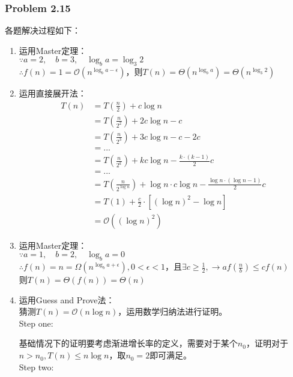 \documentclass[UTF8,12pt]{article} %
\makeatletter
\theoremstyle{definition}
\newenvironment{proof}[1][\protect\proofname]{\par
\normalfont\topsep6\p@\@plus6\p@\relax
\trivlist
\itemindent\parindent
\item[\hskip\labelsep
\scshape
#1]\ignorespaces
}{%
\endtrivlist\@endpefalse
}
\renewcommand{\proofname}{\it{\textbf{证明}}}
\makeatother
\begin{document}
\subsubsection*{Problem 2.15}
\begin{proof}[\textbf{解答}]
各题解决过程如下：
\begin{enumerate}[1)]
	\item 运用Master定理： \\ 
	$\because a = 2, \quad b=3, \quad \log_{b}a = \log_{3}2$\\
		$\therefore f(n) = 1 = \mathcal{O}(n^{\log_{b}a - \epsilon})$，则$T(n) = \Theta(n^{\log_{b}a})= \Theta(n^{\log_{3}2})$

	\item 运用直接展开法：\[\begin{split}
	T(n) &= T(\displaystyle \frac{n}{2}) + c\log n\\
	&= T(\displaystyle \frac{n}{2^{2}}) + 2c\log n -c\\
	&= T(\displaystyle \frac{n}{2^{3}}) + 3c\log n -c-2c\\
	&= ...\\
	&= T(\displaystyle \frac{n}{2^{k}}) + kc\log n -\frac{k\cdot (k-1)}{2}c\\
	&= ...\\
	&= T(\displaystyle \frac{n}{2^{\log n}}) + \log n \cdot c\log n -\frac{\log n\cdot (\log n-1)}{2}c\\
	&= T(1) + \frac{c}{2}\cdot[(\log n)^{2}-\log n]\\
	&= \mathcal{O}((\log n)^{2})
						\end{split}\]

	\item 运用Master定理：\\
	$\because a = 1, \quad b=2, \quad \log_{b}a = 0$\\
		$\therefore f(n) = n = \Omega(n^{\log_{b}a + \epsilon}), 0<\epsilon<1$，且$\exists c \geq \frac{1}{2}, \rightarrow af(\frac{n}{b})\leq cf(n) $\\
		则$T(n) = \Theta(f(n))= \Theta(n)$

	\item  运用Guess and Prove法：\\
	猜测$T(n) = \mathcal{O}(n\log n)$，运用数学归纳法进行证明。\\
	Step one:

	基础情况下的证明要考虑渐进增长率的定义，需要对于某个$n_{0}$，证明对于$n>n_{0}, T(n)\leq n\log n$，取$n_{0}=2$即可满足。\\
	Step two:


\end{enumerate}
\end{proof}
\end{document}

